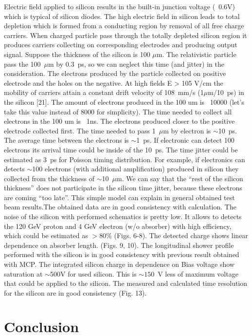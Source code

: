 \documentclass[12pt]{article}
\begin{document}
Electric field applied to silicon results in the built-in junction voltage
(~0.6V) which is typical of silicon diodes. The high electric field in silicon
leads to total depletion which is formed from a conducting region by removal of
all free charge carriers. When charged particle pass through the totally
depleted silicon region it produces carriers collecting on corresponding
electrodes and producing output signal. Suppose the thickness of the silicon is
100 $\mu$m. The relativistic particle pass the 100~$\mu$m by 0.3~ps, so we can neglect
this time (and jitter) in the consideration. The electrons produced by the
particle collected on positive electrode and the holes on the negative. At high
fields E > 105 V/cm the mobility of carriers attain a constant drift velocity of
108~mm/s (1$\mu$m/10~ps) in the silicon [21]. The amount of electrons produced in the
100 um is ~10000 (let’s take this value instead of 8000 for simplicity). The
time needed to collect all electrons in the 100 um is ~1ns. The electrons produced closer to the positive electrode collected first. The
time needed to pass 1~$\mu$m by electron is $\sim$10~ps. The average time between the
electrons is $\sim$1~ps. If electronic can detect 100 electrons its arrival time
could be inside of the 10~ps. The time jitter could be estimated as 3~ps for
Poisson timing distribution. For example, if electronics can detects $\sim$100
electrons (with additional amplification) produced in silicon they collected
from the thickness of $\sim$10~$\mu$m. We can say that the ``rest of the silicon
thickness'' does not participate in the silicon time jitter, because these
electrons are coming ``too late''. This simple model can explain in general
obtained test beam results.The obtained data are in good consistency with calculation. The noise of the
silicon with performed schematics is pretty low. It allows to detects the 120
GeV proton and 4 GeV electron (w/o absorber) with high efficiency, which could
be estimated as $>80$\% (Figs. 6-8). The detected charge shows linear dependence
on absorber length. (Figs. 9, 10). The longitudinal shower profile performed
with the silicon is in good consistency with previous result obtained with MCP.
The integrated silicon charge in dependence on Bias voltage show saturation at
$\sim$500V for used silicon. This is $\sim 150$~V less of maximum voltage that could be
applied to the silicon. The measured and calculated time resolution for the
silicon are in good consistency (Fig. 13).


\section{Conclusion}
\label{sec:conclusion} 
\end{document}
